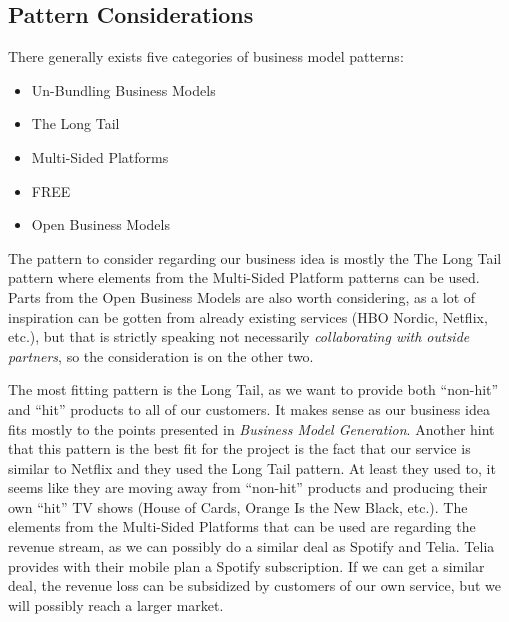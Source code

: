 \subsection{Pattern Considerations}
There generally exists five categories of business model patterns\cite[p. 52-119]{canvas}:
\begin{itemize}
\item Un-Bundling Business Models
\item The Long Tail
\item Multi-Sided Platforms
\item FREE
\item Open Business Models
\end{itemize}

The pattern to consider regarding our business idea is mostly the The Long Tail pattern where elements from the Multi-Sided Platform patterns can be used. Parts from the Open Business Models are also worth considering, as a lot of inspiration can be gotten from already existing services (HBO Nordic, Netflix, etc.), but that is strictly speaking not necessarily \emph{collaborating with outside partners}\cite[p. 109]{canvas}, so the consideration is on the other two.

The most fitting pattern is the Long Tail, as we want to provide both ``non-hit'' and ``hit'' products to all of our customers. It makes sense as our business idea fits mostly to the points presented in \emph{Business Model Generation}\cite[p. 75]{canvas}. Another hint that this pattern is the best fit for the project is the fact that our service is similar to Netflix and they used the Long Tail pattern. At least they used to, it seems like they are moving away from ``non-hit'' products and producing their own ``hit'' TV shows (House of Cards, Orange Is the New Black, etc.). The elements from the Multi-Sided Platforms that can be used are regarding the revenue stream, as we can possibly do a similar deal as Spotify and Telia. Telia provides with their mobile plan a Spotify subscription. If we can get a similar deal, the revenue loss can be subsidized by customers of our own service, but we will possibly reach a larger market.
